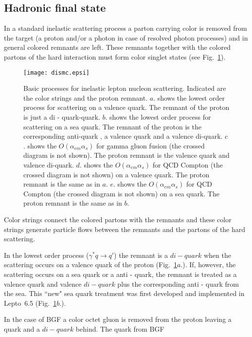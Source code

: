 \documentclass[10pt]{article} \usepackage{dina4}
\def\LEPTO{{\sc Lepto}}
\begin{document}
\subsection{Hadronic final state}
In a standard inelastic scattering process
a parton carrying color is removed from the 
target (a proton and/or a photon in case of resolved photon processes)
 and in general 
 colored remnants are left. These remnants together with the
colored partons of the hard interaction  must form  color
singlet states (see Fig.~\ref{DISmc}).
\begin{figure}[ht]
\begin{center}
\centerline{\texttt{[image: dismc.epsi]}}
\end{center}
\caption{Basic processes for inelastic lepton nucleon scattering.
Indicated are the color strings and the proton remnant.
$a$. shows the lowest order process for scattering on a valence quark.
The remnant of the proton is just a di - quark-quark.
$b$. shows the lowest order process for scattering on a sea quark.
The remnant of the proton is the corresponding anti-quark , 
a valence quark and a valence di-quark.
 $c$. shows the
$O(\alpha _{em}\alpha_s)$
for gamma gluon fusion (the crossed diagram is not shown).
 The proton remnant is the valence quark and
valence di-quark.
 $d$. shows the
$O(\alpha _{em}\alpha_s)$
for QCD Compton (the crossed diagram is not shown) on a valence quark.
 The proton remnant is the same as in $a$.
 $e$. shows the
$O(\alpha _{em}\alpha_s)$
for QCD Compton (the crossed diagram is not shown) on a sea quark.
 The proton remnant is the same as in $b$.
\label{DISmc}}
\end{figure}
 Color strings connect the colored partons with the remnants and these
color strings
generate  particle
flows between the remnants and the partons of the hard
scattering.
\par 
In the lowest order process ($\gamma^* q \to q'$) the remnant is 
a $di-quark$ 
when the scattering occurs on a valence quark of the proton
(Fig.~\ref{DISmc}$a$.).
If, however, the scattering occurs on a sea quark or a anti - quark,
the remnant is treated as a valence quark and valence $di - quark$ plus
the corresponding anti - quark from the sea. This ``new" 
sea quark treatment was first developed and  
implemented in \LEPTO\ 6.5 \cite{Ingelman_LEPTO65}
(Fig.~\ref{DISmc}$b$.). 
\par 
In the case of BGF a color octet gluon is removed from the proton
leaving a quark and a $di - quark$ behind. The quark from BGF 
\end{document}

